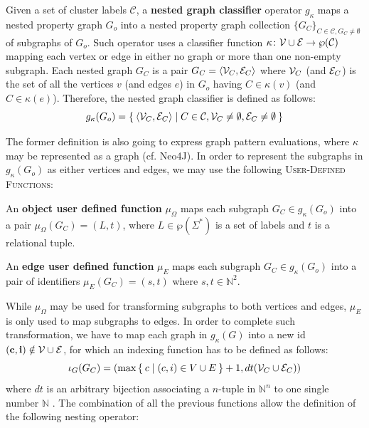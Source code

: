 \begin{definition}
	Given a set of cluster labels $\mathcal{C}$, a \textbf{nested graph classifier} operator $g_\kappa$ maps a nested property graph $G_o$ into a nested property graph collection $\{G_C\}_{C\in\mathcal{C},G_C\neq \emptyset}$ of subgraphs of $G_o$. Such operator uses a classifier function $\kappa\colon \mathcal{V}\cup \mathcal{E}\to \wp(\mathcal{C})$ mapping each vertex or edge in either no graph or more than one non-empty subgraph. Each nested graph $G_C$ is a pair
	$G_C=\Braket{\mathcal{V}_C,\mathcal{E}_C}$
	where $\mathcal{V}_C$ (and $\mathcal{E}_C$) is the set of all the vertices $v$ (and edges $e$) in $G_o$ having $C\in \kappa(v)$ (and $C\in \kappa(e)$). Therefore, the nested graph classifier is defined as follows:
	\[g_\kappa(G_o)=\Set{\Braket{\mathcal{V}_C,\mathcal{E}_C}|C\in\mathcal{C},\mathcal{V}_C\neq\emptyset,\mathcal{E}_C\neq\emptyset}\]
\end{definition}

The former definition is also going to express graph pattern evaluations, where $\kappa$ may be represented as a graph (cf. Neo4J). In order to represent the subgraphs in $g_\kappa(G_o)$ as either vertices and edges, we may use
the following \textsc{User-Defined Functions}:
\begin{definition}
	An \textbf{object user defined function} $\mu_\Omega$ maps each subgraph $G_C\in g_\kappa(G_o)$ into a pair $\mu_\Omega(G_C)=(L,t)$, where $L\in\wp(\Sigma^*)$ is a set of labels and $t$ is a relational tuple.
	
	An \textbf{edge user defined function} $\mu_E$ maps each subgraph $G_C\in g_\kappa(G_o)$ into a pair of identifiers $\mu_E(G_C)=(s,t)$ where $s,t\in\mathbb{N}^2$.
\end{definition}

While $\mu_\Omega$ may be used for transforming subgraphs to both vertices and edges, $\mu_E$ is only used to map subgraphs to edges. In order to complete such transformation,  we have to map each graph in $g_\kappa(G)$ into a new id $(\textbf{c},\textbf{i})\notin \mathcal{V}\cup \mathcal{E}$, for which an indexing function has to be defined as follows:
\[\iota_G(G_C)=(\max\Set{c|(c,i)\in V\cup E}+1,dt(\mathcal{V}_C\cup \mathcal{E}_C))\]
where $dt$ is an arbitrary bijection associating a  $n$-tuple in $\mathbb{N}^n$ to one single number $\mathbb{N}$ \cite{odifreddi1992}. The combination of all the previous functions allow the definition of the following nesting operator:



